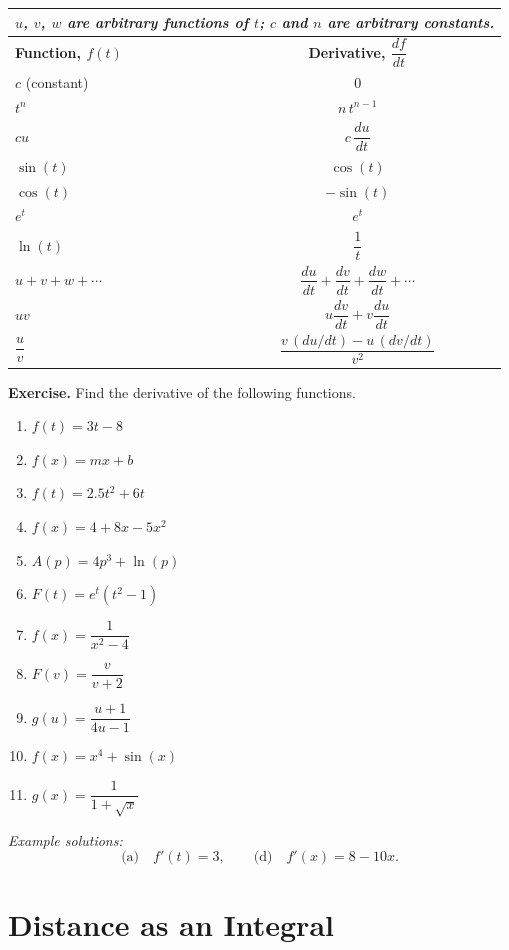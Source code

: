 \begin{center}
\begin{tabular}{lc}
  \toprule
  \multicolumn{2}{l}{\textit{$u$, $v$, $w$ are arbitrary functions of $t$; $c$ and $n$ are arbitrary constants.}} \\
  \midrule
  \textbf{Function, $f(t)$} & \textbf{Derivative, $\dfrac{df}{dt}$} \\
  \midrule
  $c$ (constant) & $0$ \\[4pt]
  $t^n$ & $n\,t^{n-1}$ \\[4pt]
  $cu$ & $c\,\dfrac{du}{dt}$ \\[4pt]
  $\sin(t)$ & $\cos(t)$ \\[4pt]
  $\cos(t)$ & $-\sin(t)$ \\[4pt]
  $e^t$ & $e^t$ \\[4pt]
  $\ln(t)$ & $\dfrac{1}{t}$ \\[4pt]
  $u+v+w+\cdots$ & $\dfrac{du}{dt}+\dfrac{dv}{dt}+\dfrac{dw}{dt}+\cdots$ \\[4pt]
  $uv$ & $u\dfrac{dv}{dt}+v\dfrac{du}{dt}$ \\[4pt]
  $\dfrac{u}{v}$ & $\dfrac{v\,(du/dt)-u\,(dv/dt)}{v^2}$ \\
  \bottomrule
\end{tabular}
\end{center}

\textbf{Exercise.} Find the derivative of the following functions.
\begin{enumerate}[label=\alph*.]
  \item $f(t) = 3t - 8$
  \item $f(x) = mx + b$
  \item $f(t) = 2.5t^2 + 6t$
  \item $f(x) = 4 + 8x - 5x^2$
  \item $A(p) = 4p^3 + \ln(p)$
  \item $F(t) = e^t(t^2-1)$
  \item $f(x) = \dfrac{1}{x^2-4}$
  \item $F(v) = \dfrac{v}{v+2}$
  \item $g(u) = \dfrac{u+1}{4u-1}$
  \item $f(x) = x^4 + \sin(x)$
  \item $g(x) = \dfrac{1}{1+\sqrt{x}}$
\end{enumerate}

\textit{Example solutions:}
\[
  \text{(a)}\quad f'(t) = 3, \qquad
  \text{(d)}\quad f'(x) = 8 - 10x.
\]


\section{Distance as an Integral}

